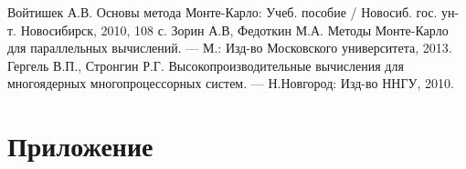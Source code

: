 \documentclass{report}
\begin{document}
\begin{thebibliography}{1}
 Войтишек А.В. Основы метода Монте-Карло: Учеб. пособие / Новосиб. гос. ун-т. Новосибирск, 2010, 108 с. 
 Зорин А.В, Федоткин М.А. Методы Монте-Карло для параллельных вычислений. — М.: Изд-во Московского университета, 2013.
 Гергель В.П., Стронгин Р.Г. Высокопроизводительные вычисления для многоядерных многопроцессорных систем. — Н.Новгород: Изд-во ННГУ, 2010.
\end{thebibliography}
\newpage

\section*{Приложение}
\end{document}
